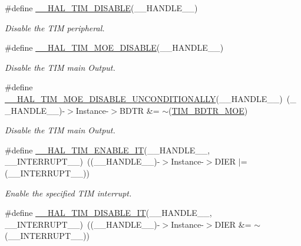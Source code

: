 \begin{DoxyCompactItemize}
\#define \hyperlink{group___t_i_m___exported___macros_ga6a5e653e0e06a04151b74eb1a5f96eb6}{\+\_\+\+\_\+\+H\+A\+L\+\_\+\+T\+I\+M\+\_\+\+D\+I\+S\+A\+B\+LE}(\+\_\+\+\_\+\+H\+A\+N\+D\+L\+E\+\_\+\+\_\+)
\begin{DoxyCompactList}\small\item\em Disable the T\+IM peripheral. \end{DoxyCompactList}\item 
\#define \hyperlink{group___t_i_m___exported___macros_ga69d63e147faeca8909e9679f684c0325}{\+\_\+\+\_\+\+H\+A\+L\+\_\+\+T\+I\+M\+\_\+\+M\+O\+E\+\_\+\+D\+I\+S\+A\+B\+LE}(\+\_\+\+\_\+\+H\+A\+N\+D\+L\+E\+\_\+\+\_\+)
\begin{DoxyCompactList}\small\item\em Disable the T\+IM main Output. \end{DoxyCompactList}\item 
\#define \hyperlink{group___t_i_m___exported___macros_gaa5c4053e8e57dc234efecbb698287b55}{\+\_\+\+\_\+\+H\+A\+L\+\_\+\+T\+I\+M\+\_\+\+M\+O\+E\+\_\+\+D\+I\+S\+A\+B\+L\+E\+\_\+\+U\+N\+C\+O\+N\+D\+I\+T\+I\+O\+N\+A\+L\+LY}(\+\_\+\+\_\+\+H\+A\+N\+D\+L\+E\+\_\+\+\_\+)~(\+\_\+\+\_\+\+H\+A\+N\+D\+L\+E\+\_\+\+\_\+)-\/$>$Instance-\/$>$B\+D\+TR \&= $\sim$(\hyperlink{group___peripheral___registers___bits___definition_ga277a096614829feba2d0a4fbb7d3dffc}{T\+I\+M\+\_\+\+B\+D\+T\+R\+\_\+\+M\+OE})
\begin{DoxyCompactList}\small\item\em Disable the T\+IM main Output. \end{DoxyCompactList}\item 
\#define \hyperlink{group___t_i_m___exported___macros_ga4d69943bc4716743c78e3194e259097e}{\+\_\+\+\_\+\+H\+A\+L\+\_\+\+T\+I\+M\+\_\+\+E\+N\+A\+B\+L\+E\+\_\+\+IT}(\+\_\+\+\_\+\+H\+A\+N\+D\+L\+E\+\_\+\+\_\+,  \+\_\+\+\_\+\+I\+N\+T\+E\+R\+R\+U\+P\+T\+\_\+\+\_\+)~((\+\_\+\+\_\+\+H\+A\+N\+D\+L\+E\+\_\+\+\_\+)-\/$>$Instance-\/$>$D\+I\+ER $\vert$= (\+\_\+\+\_\+\+I\+N\+T\+E\+R\+R\+U\+P\+T\+\_\+\+\_\+))
\begin{DoxyCompactList}\small\item\em Enable the specified T\+IM interrupt. \end{DoxyCompactList}\item 
\#define \hyperlink{group___t_i_m___exported___macros_ga31d67e905bc62e3142179dc4bbf8ba64}{\+\_\+\+\_\+\+H\+A\+L\+\_\+\+T\+I\+M\+\_\+\+D\+I\+S\+A\+B\+L\+E\+\_\+\+IT}(\+\_\+\+\_\+\+H\+A\+N\+D\+L\+E\+\_\+\+\_\+,  \+\_\+\+\_\+\+I\+N\+T\+E\+R\+R\+U\+P\+T\+\_\+\+\_\+)~((\+\_\+\+\_\+\+H\+A\+N\+D\+L\+E\+\_\+\+\_\+)-\/$>$Instance-\/$>$D\+I\+ER \&= $\sim$(\+\_\+\+\_\+\+I\+N\+T\+E\+R\+R\+U\+P\+T\+\_\+\+\_\+))

\end{DoxyCompactItemize}
